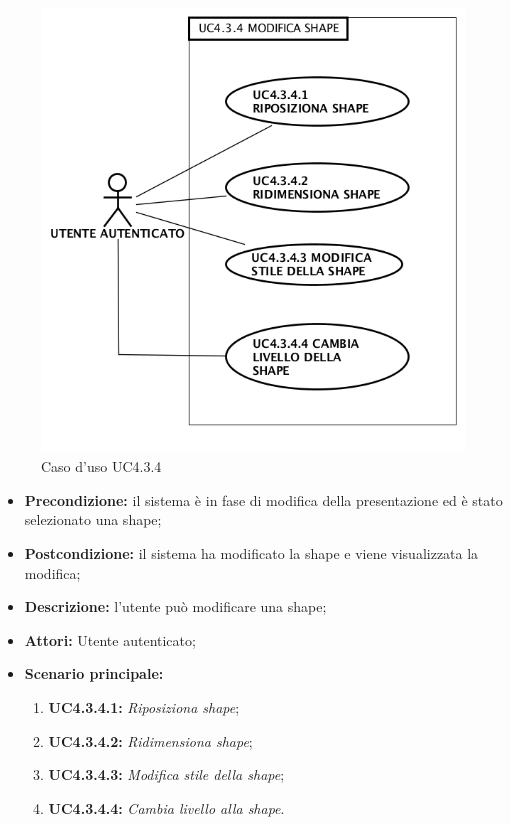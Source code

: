 \begin{figure}[h]
	\begin{center}
	\includegraphics[scale=0.4]{diagram/UC4-3-4.png}
	\caption{Caso d'uso UC4.3.4}
	\end{center}
\end{figure}
\begin{itemize}
	\item \textbf{Precondizione:} il sistema è in fase di modifica della presentazione ed è stato selezionato una shape;
	\item \textbf{Postcondizione:} il sistema ha modificato la shape e viene visualizzata la modifica;
	\item \textbf{Descrizione:} l'utente può modificare una shape;
	\item \textbf{Attori:} Utente autenticato;
	\item \textbf{Scenario principale:}
	\begin{enumerate}
		\item \textbf{ UC4.3.4.1:} \textit{ Riposiziona shape};
		\item \textbf{ UC4.3.4.2:} \textit{ Ridimensiona shape};
		\item \textbf{ UC4.3.4.3:} \textit{ Modifica stile della shape};
		\item \textbf{ UC4.3.4.4:} \textit{ Cambia livello alla shape}.
	\end{enumerate}
\end{itemize}
